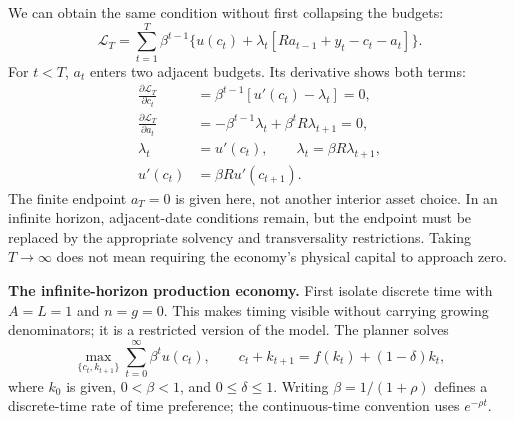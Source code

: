 We can obtain the same condition without first collapsing the budgets:
\[
\mathscr L_T=\sum_{t=1}^T\beta^{t-1}
 \{u(c_t)+\lambda_t[Ra_{t-1}+y_t-c_t-a_t]\}.
\]
For $t<T$, $a_t$ enters two adjacent budgets. Its derivative shows both terms:
\begin{align}
\frac{\partial\mathscr L_T}{\partial c_t}
 &=\beta^{t-1}[u'(c_t)-\lambda_t]=0,\\
\frac{\partial\mathscr L_T}{\partial a_t}
 &=-\beta^{t-1}\lambda_t+\beta^tR\lambda_{t+1}=0,\\
\lambda_t&=u'(c_t),\qquad
\lambda_t=\beta R\lambda_{t+1},\\
u'(c_t)&=\beta R u'(c_{t+1}).
\end{align}
The finite endpoint $a_T=0$ is given here, not another interior asset choice.
In an infinite horizon, adjacent-date conditions remain, but the endpoint
must be replaced by the appropriate solvency and transversality restrictions.
Taking $T\to\infty$ does not mean requiring the economy's physical capital
to approach zero.

\textbf{The infinite-horizon production economy.}
First isolate discrete time with $A=L=1$ and $n=g=0$. This makes timing visible
without carrying growing denominators; it is a restricted version of the model.
The planner solves
\begin{equation}
\max_{\{c_t,k_{t+1}\}}\sum_{t=0}^\infty\beta^tu(c_t),\qquad
c_t+k_{t+1}=f(k_t)+(1-\delta)k_t,
\end{equation}
where $k_0$ is given, $0<\beta<1$, and $0\leq\delta\leq1$. Writing
$\beta=1/(1+\rho)$ defines a discrete-time rate of time preference; the
continuous-time convention uses $e^{-\rho t}$.

